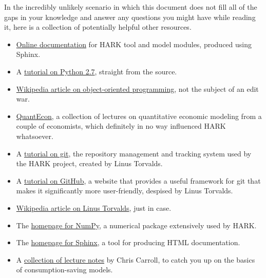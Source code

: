 \documentclass[12pt,titlepage,letterpaper]{econtex}
\begin{document}
{In the incredibly unlikely scenario in which this document does not fill all of the gaps in your knowledge and answer any questions you might have while reading it, here is a collection of potentially helpful other resources.

\begin{itemize}

\item \href{https://econ-ark.github.io/HARK/}{Online documentation} for HARK tool and model modules, produced using Sphinx.

\item A \href{https://docs.python.org/2.7/tutorial/}{tutorial on Python 2.7}, straight from the source.

\item \href{https://en.wikipedia.org/wiki/Object-oriented_programming}{Wikipedia article on object-oriented programming}, not the subject of an edit war.

\item \href{http://quant-econ.net/}{QuantEcon}, a collection of lectures on quantitative economic modeling from a couple of economists, which definitely in no way influenced HARK whatsoever.

\item A \href{https://www.atlassian.com/git/tutorials/}{tutorial on git}, the repository management and tracking system used by the HARK project, created by Linus Torvalds.

\item A \href{https://guides.github.com/activities/hello-world/}{tutorial on GitHub}, a website that provides a useful framework for git that makes it significantly more user-friendly, despised by Linus Torvalds.

\item \href{https://en.wikipedia.org/wiki/Linus_Torvalds}{Wikipedia article on Linus Torvalds}, just in case.

\item The \href{http://www.numpy.org/}{homepage for NumPy}, a numerical package extensively used by HARK.

\item The \href{http://www.sphinx-doc.org/}{homepage for Sphinx}, a tool for producing HTML documentation.

\item A \href{http://www.econ2.jhu.edu/people/ccarroll/public/lecturenotes/Consumption/}{collection of lecture notes} by Chris Carroll, to catch you up on the basics of consumption-saving models.


\end{itemize}}
\end{document}
